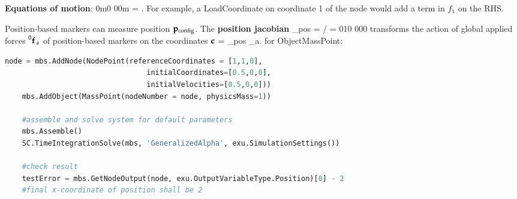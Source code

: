     {\bf Equations of motion}:
    \be 
       {0}{m}{0} {0}{0}{m}  = .
    \ee
    For example, a LoadCoordinate on coordinate 1 of the node would add a term in $f_1$ on the RHS.
    
    Position-based markers can measure position $\mathbf{p}_\mathrm{config}$. The {\bf position jacobian}  
    \be
      \Jm_{pos} = \partial \pv\cCur / \partial \cv\cCur =  {0}{1}{0} {0}{0}{0}
    \ee
    transforms the action of global applied forces $\prescript{0}{}{\mathbf{f}}\,_a$ of position-based markers on the coordinates $\mathbf{c}$
    \be
      \Qm = \Jm_{pos} _a.
    \ee
{} for ObjectMassPoint:
\pythonstyle
\begin{lstlisting}[language=Python, firstnumber=1]
    node = mbs.AddNode(NodePoint(referenceCoordinates = [1,1,0], 
                                 initialCoordinates=[0.5,0,0],
                                 initialVelocities=[0.5,0,0]))
    mbs.AddObject(MassPoint(nodeNumber = node, physicsMass=1))

    #assemble and solve system for default parameters
    mbs.Assemble()
    SC.TimeIntegrationSolve(mbs, 'GeneralizedAlpha', exu.SimulationSettings())

    #check result
    testError = mbs.GetNodeOutput(node, exu.OutputVariableType.Position)[0] - 2 
    #final x-coordinate of position shall be 2

\end{lstlisting}

\newpage

